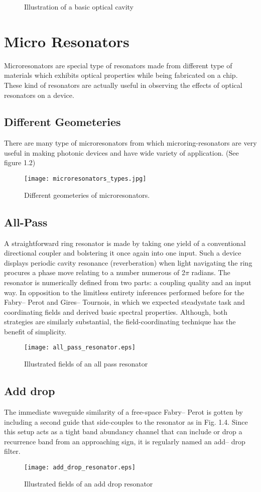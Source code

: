 \begin{figure}[h]
\centering
{}
\caption{Illustration of a basic optical cavity}
\end{figure}

\section{Micro Resonators}
Microresonators are special type of resonators made from different type of materials which exhibits optical properties while being fabricated on a chip. These kind of resonators are actually useful in observing the effects of optical resonators on a device.
\subsection{Different Geometeries}
There are many type of microresonators from which microring-resonators are very useful in making photonic devices and have wide variety of application. (See figure 1.2)
\begin{figure}[h]
\centering
\texttt{[image: microresonators\_types.jpg]}
\caption{Different geometeries of microresonators.}
\end{figure}

\subsection{All-Pass}
A straightforward ring resonator is made by taking one yield of a conventional directional coupler and bolstering it once again into one input. Such a device displays periodic cavity resonance (reverberation) when light navigating the ring procures a phase move relating to a number numerous of 2$\pi$ radians. The resonator is numerically defined from two parts: a coupling quality and an input way. In opposition to the limitless entirety inferences performed before for the Fabry– Perot and Gires– Tournois, in which we expected steadystate task and coordinating fields and derived basic spectral properties. Although, both strategies are similarly substantial, the field-coordinating technique has the benefit of simplicity.
\begin{figure}[h]
\centering
\texttt{[image: all\_pass\_resonator.eps]}
\caption{Illustrated fields of an all pass resonator}
\end{figure}
\subsection{Add drop}
The immediate waveguide similarity of a free-space Fabry– Perot is gotten by including a second guide that side-couples to the resonator as in Fig. 1.4.
Since this setup acts as a tight band abundancy channel that can include or drop a recurrence band from an approaching sign, it is regularly named an add– drop filter.
\begin{figure}[h]
\centering
\texttt{[image: add\_drop\_resonator.eps]}
\caption{Illustrated fields of an add drop resonator}
\end{figure}
